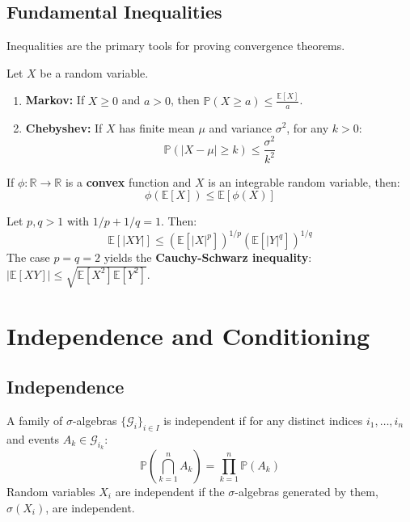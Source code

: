 \subsection{Fundamental Inequalities}

Inequalities are the primary tools for proving convergence theorems.

\begin{theorem}
Let $X$ be a random variable.
\begin{enumerate}
    \item \textbf{Markov:} If $X \ge 0$ and $a > 0$, then $\mathbb{P}(X \ge a) \le \frac{\mathbb{E}[X]}{a}$.
    \item \textbf{Chebyshev:} If $X$ has finite mean $\mu$ and variance $\sigma^2$, for any $k > 0$:
    \[ \mathbb{P}(|X - \mu| \ge k) \le \frac{\sigma^2}{k^2} \]
\end{enumerate}
\end{theorem}

\begin{theorem}
If $\phi: \mathbb{R} \to \mathbb{R}$ is a \textbf{convex} function and $X$ is an integrable random variable, then:
\[ \phi(\mathbb{E}[X]) \le \mathbb{E}[\phi(X)] \]
\end{theorem}

\begin{theorem}
Let $p, q > 1$ with $1/p + 1/q = 1$. Then:
\[ \mathbb{E}[|XY|] \le (\mathbb{E}[|X|^p])^{1/p} (\mathbb{E}[|Y|^q])^{1/q} \]
The case $p=q=2$ yields the \textbf{Cauchy-Schwarz inequality}: $|\mathbb{E}[XY]| \le \sqrt{\mathbb{E}[X^2]\mathbb{E}[Y^2]}$.
\end{theorem}

\section{Independence and Conditioning}

\subsection{Independence}

\begin{definition}[Independence]
A family of $\sigma$-algebras $\{\mathcal{G}_i\}_{i \in I}$ is independent if for any distinct indices $i_1, \dots, i_n$ and events $A_k \in \mathcal{G}_{i_k}$:
\[ \mathbb{P}\left(\bigcap_{k=1}^n A_k\right) = \prod_{k=1}^n \mathbb{P}(A_k) \]
Random variables $X_i$ are independent if the $\sigma$-algebras generated by them, $\sigma(X_i)$, are independent.
\end{definition}

